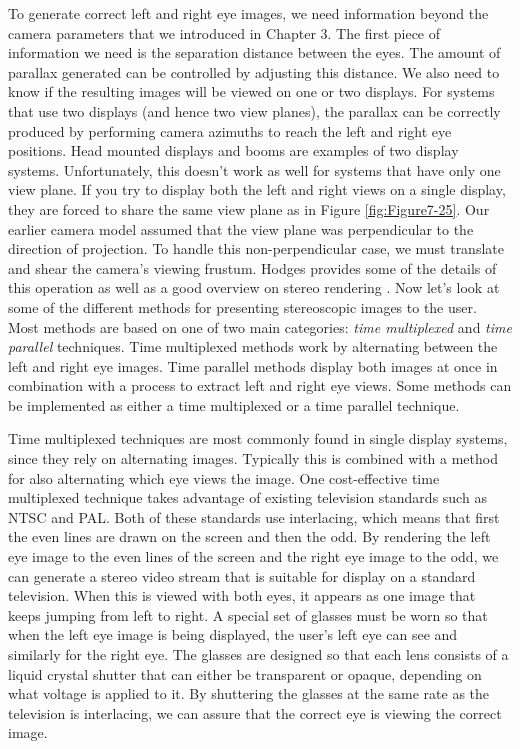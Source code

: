 To generate correct left and right eye images, we need information beyond the camera parameters that we introduced in Chapter 3. The first piece of information we need is the separation distance between the eyes. The amount of parallax generated can be controlled by adjusting this distance. We also need to know if the resulting images will be viewed on one or two displays. For systems that use two displays (and hence two view planes), the parallax can be correctly produced by performing camera azimuths to reach the left and right eye positions. Head mounted displays and booms are examples of two display systems. Unfortunately, this doesn't work as well for systems that have only one view plane. If you try to display both the left and right views on a single display, they are forced to share the same view plane as in Figure \ref{fig:Figure7-25}. Our earlier camera model assumed that the view plane was perpendicular to the direction of projection. To handle this non-perpendicular case, we must translate and shear the camera's viewing frustum. Hodges provides some of the details of this operation as well as a good overview on stereo rendering \cite{Hodges92}.  Now let's look at some of the different methods for presenting stereoscopic images to the user. Most methods are based on one of two main categories: \emph{time multiplexed} and \emph{time parallel} techniques. Time multiplexed methods work by alternating between the left and right eye images. Time parallel methods display both images at once in combination with a process to extract left and right eye views. Some methods can be implemented as either a time multiplexed or a time parallel technique.

Time multiplexed techniques are most commonly found in single display systems, since they rely on alternating images. Typically this is combined with a method for also alternating which eye views the image. One cost-effective time multiplexed technique takes advantage of existing television standards such as NTSC and PAL. Both of these standards use interlacing, which means that first the even lines are drawn on the screen and then the odd. By rendering the left eye image to the even lines of the screen and the right eye image to the odd, we can generate a stereo video stream that is suitable for display on a standard television. When this is viewed with both eyes, it appears as one image that keeps jumping from left to right. A special set of glasses must be worn so that when the left eye image is being displayed, the user's left eye can see and similarly for the right eye. The glasses are designed so that each lens consists of a liquid crystal shutter that can either be transparent or opaque, depending on what voltage is applied to it. By shuttering the glasses at the same rate as the television is interlacing, we can assure that the correct eye is viewing the correct image.

